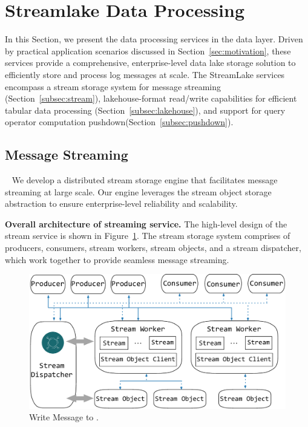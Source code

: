 \section{Streamlake Data Processing} 
\label{sec:dataeva}

In this Section, we present the data processing services  in the data layer. Driven by practical application scenarios discussed in Section~\ref{sec:motivation}, these services provide a comprehensive, enterprise-level data lake storage solution  to efficiently store and process  log messages at scale. The StreamLake services encompass a stream storage system for message streaming (Section~\ref{subsec:stream}), lakehouse-format read/write capabilities for efficient tabular data processing (Section~\ref{subsec:lakehouse}), and support for query operator computation pushdown(Section~\ref{subsec:pushdown}).


\subsection{Message Streaming}~\label{subsec:stream}
We develop a  distributed stream storage engine that facilitates message streaming at large scale. Our engine leverages the stream object storage abstraction to ensure enterprise-level reliability and scalability.


\noindent\textbf{Overall architecture of streaming service.} The high-level design of the stream service is shown in Figure~\ref{fig:service}. The stream storage system comprises of producers, consumers, stream workers, stream objects, and a stream dispatcher, which work together to provide seamless message streaming.



\begin{figure}[htbp]
	
	\includegraphics[scale=0.4]{figures/streamservice}
	\centering
	\vspace{-1em}
	\caption{Write Message to \sys.}
	\label{fig:service}
	\vspace{-1em}
\end{figure}

